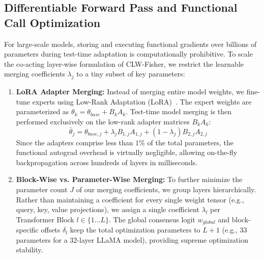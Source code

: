 \documentclass{article}
\theoremstyle{plain}
\theoremstyle{definition}
\theoremstyle{remark}
\begin{document}
\subsection{Differentiable Forward Pass and Functional Call Optimization}
For large-scale models, storing and executing functional gradients over billions of parameters during test-time adaptation is computationally prohibitive. To scale the co-acting layer-wise formulation of CLW-Fisher, we restrict the learnable merging coefficients $\lambda_j$ to a tiny subset of key parameters:
\begin{enumerate}
  \item \textbf{LoRA Adapter Merging:} Instead of merging entire model weights, we fine-tune experts using Low-Rank Adaptation (LoRA)~\cite{hu2021lora}. The expert weights are parameterized as $\theta_k = \theta_{base} + B_k A_k$. Test-time model merging is then performed exclusively on the low-rank adapter matrices $B_k A_k$:
    \begin{equation}
      \bar{\theta}_{j} = \theta_{base, j} + \lambda_j B_{1, j} A_{1, j} + (1 - \lambda_j) B_{2, j} A_{2, j}
    \end{equation}
    Since the adapters comprise less than $1\%$ of the total parameters, the functional autograd overhead is virtually negligible, allowing on-the-fly backpropagation across hundreds of layers in milliseconds.
  \item \textbf{Block-Wise vs. Parameter-Wise Merging:} To further minimize the parameter count $J$ of our merging coefficients, we group layers hierarchically. Rather than maintaining a coefficient for every single weight tensor (e.g., query, key, value projections), we assign a single coefficient $\lambda_l$ per Transformer Block $l \in \{1 \dots L\}$. The global consensus logit $w_{global}$ and block-specific offsets $\delta_l$ keep the total optimization parameters to $L+1$ (e.g., 33 parameters for a 32-layer LLaMA model), providing supreme optimization stability.
\end{enumerate}
\end{document}
